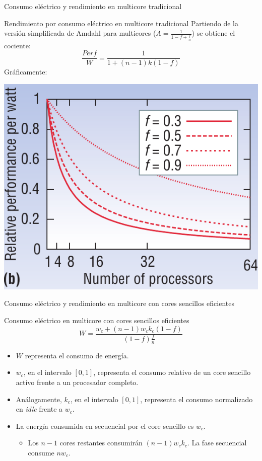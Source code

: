 \documentclass[utf8]{beamer}
\begin{document}
\begin{frame}{Consumo eléctrico y rendimiento en multicore tradicional}
    \small
    \begin{block}{Rendimiento por consumo eléctrico en multicore tradicional}
        Partiendo de la versión simplificada de Amdahl para multicores ($ A = \frac{1}{1 - f + \frac{f}{n}} $) se obtiene el cociente:
        $$ \frac{Perf}{W} = \frac{1}{1 + (n - 1)k(1-f)} $$
        Gráficamente:
     \end{block} 
    \begin{center}
        \includegraphics[width=.3\linewidth]{figures/am_powperf_a}      
    \end{center}
\end{frame}

\begin{frame}{Consumo eléctrico y rendimiento en multicore con cores sencillos eficientes}
    \begin{block}{Consumo eléctrico en multicore con cores sencillos eficientes}
        $$ W = \frac{w_{c}+ (n - 1)w_{c}k_{c}(1-f)}{(1 - f)\frac{f}{n}} $$
        \begin{itemize}
             \item $ W $ representa el consumo de energía.
             \item $ w_{c} $, en el intervalo $ [0,1] $, representa el consumo relativo de un core sencillo activo frente a un procesador completo.
             \item Análogamente, $ k_{c} $, en el intervalo $ [0,1] $, representa el consumo normalizado en \textit{idle} frente a $ w_{c} $.
             \item La energía consumida en secuencial por el core sencillo es $ w_{c} $.
                \begin{itemize}
                    \item Los $ n -1 $ cores restantes consumirán $ (n -1)w_{c}k_{c} $. La fase secuencial consume $ n w_{c} $.
                \end{itemize}
        \end{itemize}
    \end{block}  
\end{frame}
\end{document}
